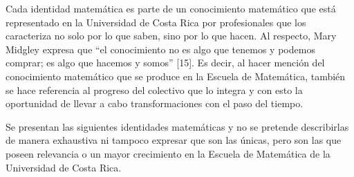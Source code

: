 Cada identidad matemática es parte de un conocimiento matemático que está representado en la Universidad de Costa Rica por profesionales que los caracteriza no solo por lo que saben, sino por lo que hacen. Al respecto, Mary Midgley expresa que “el conocimiento no es algo que tenemos y podemos comprar; es algo que hacemos y somos” [15]. Es decir, al hacer mención del conocimiento matemático que se produce en la Escuela de Matemática, también se hace referencia al progreso del colectivo que lo integra y con esto la oportunidad de llevar a cabo transformaciones con el paso del tiempo.

Se presentan las siguientes identidades matemáticas y no se pretende describirlas de manera exhaustiva ni tampoco expresar que son las únicas, pero son las que poseen relevancia o un mayor crecimiento en la Escuela de Matemática de la Universidad de Costa Rica. 

